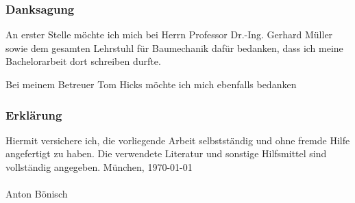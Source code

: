 \label{cha:erkl}

\subsubsection{Danksagung}
An erster Stelle möchte ich mich bei Herrn Professor Dr.-Ing. Gerhard Müller sowie dem gesamten Lehrstuhl für Baumechanik dafür bedanken, dass ich meine Bachelorarbeit dort schreiben durfte. 

Bei meinem Betreuer Tom Hicks möchte ich mich ebenfalls bedanken

\subsubsection{Erklärung}
Hiermit versichere ich, die vorliegende Arbeit selbstständig und ohne fremde Hilfe angefertigt zu haben. Die verwendete Literatur und sonstige Hilfsmittel sind vollständig angegeben.
\vfill
München, \today \\
\vspace{3cm} \\
Anton Bönisch
\vfill
